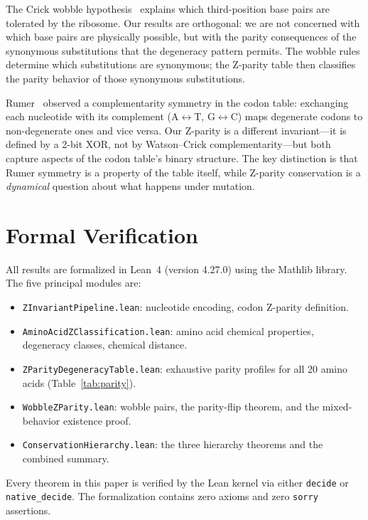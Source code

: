 \documentclass[11pt,twocolumn]{article}
\begin{document}
The Crick wobble hypothesis~\cite{Crick1966} explains which
third-position base pairs are tolerated by the ribosome. Our results are
orthogonal: we are not concerned with which base pairs are physically
possible, but with the parity consequences of the synonymous substitutions
that the degeneracy pattern permits. The wobble rules determine which
substitutions are synonymous; the Z-parity table then classifies the
parity behavior of those synonymous substitutions.

Rumer~\cite{Rumer1966} observed a complementarity symmetry in the codon
table: exchanging each nucleotide with its complement (A$\leftrightarrow$T,
G$\leftrightarrow$C) maps degenerate codons to non-degenerate ones and vice
versa. Our Z-parity is a different invariant---it is defined by a 2-bit XOR,
not by Watson--Crick complementarity---but both capture aspects of the
codon table's binary structure. The key distinction is that Rumer symmetry
is a property of the table itself, while Z-parity conservation is a
\emph{dynamical} question about what happens under mutation.

\section{Formal Verification}

All results are formalized in Lean~4 (version 4.27.0) using the Mathlib
library. The five principal modules are:

\begin{itemize}
\item \texttt{ZInvariantPipeline.lean}: nucleotide encoding, codon
  Z-parity definition.
\item \texttt{AminoAcidZClassification.lean}: amino acid chemical
  properties, degeneracy classes, chemical distance.
\item \texttt{ZParityDegeneracyTable.lean}: exhaustive parity profiles
  for all 20 amino acids (Table~\ref{tab:parity}).
\item \texttt{WobbleZParity.lean}: wobble pairs, the parity-flip theorem,
  and the mixed-behavior existence proof.
\item \texttt{ConservationHierarchy.lean}: the three hierarchy theorems
  and the combined summary.
\end{itemize}

Every theorem in this paper is verified by the Lean kernel via either
\texttt{decide} or \texttt{native\_decide}. The formalization contains
zero axioms and zero \texttt{sorry} assertions.
\end{document}
